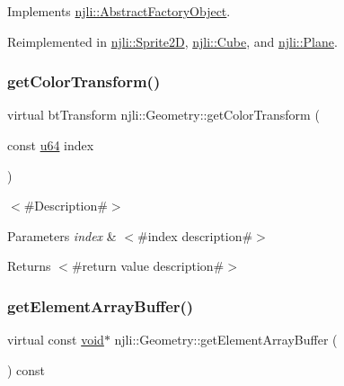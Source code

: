 Implements \mbox{\hyperlink{classnjli_1_1_abstract_factory_object_af4151e41b80d5bc3fc42822c67fc2278}{njli\+::\+Abstract\+Factory\+Object}}.



Reimplemented in \mbox{\hyperlink{classnjli_1_1_sprite2_d_a6e82261effc23589cca219ddb5c90851}{njli\+::\+Sprite2D}}, \mbox{\hyperlink{classnjli_1_1_cube_ab6515dcb9f54a3bf9945dacbb88d2eca}{njli\+::\+Cube}}, and \mbox{\hyperlink{classnjli_1_1_plane_a9a7ccbc86c1f486cd816f0f4f3e9c550}{njli\+::\+Plane}}.

\mbox{\label{classnjli_1_1_geometry_ae7af4b2e9fb67dbc658492290aeeacad}} 
\subsubsection{\texorpdfstring{get\+Color\+Transform()}{getColorTransform()}}
{\footnotesize\ttfamily virtual bt\+Transform njli\+::\+Geometry\+::get\+Color\+Transform (\begin{DoxyParamCaption}\item[{const \mbox{\hyperlink{_util_8h_ad758b7a5c3f18ed79d2fcd23d9f16357}{u64}}}]{index }\end{DoxyParamCaption})\hspace{0.3cm}{\ttfamily [virtual]}}

$<$\#\+Description\#$>$


\begin{DoxyParams}{Parameters}
{\em index} & $<$\#index description\#$>$\\
\hline
\end{DoxyParams}
\begin{DoxyReturn}{Returns}
$<$\#return value description\#$>$ 
\end{DoxyReturn}
\mbox{\label{classnjli_1_1_geometry_ac4edd389ae104da289e2282d780454f0}} 
\subsubsection{\texorpdfstring{get\+Element\+Array\+Buffer()}{getElementArrayBuffer()}}
{\footnotesize\ttfamily virtual const \mbox{\hyperlink{_thread_8h_af1e856da2e658414cb2456cb6f7ebc66}{void}}$\ast$ njli\+::\+Geometry\+::get\+Element\+Array\+Buffer (\begin{DoxyParamCaption}{ }\end{DoxyParamCaption}) const\hspace{0.3cm}{\ttfamily [pure virtual]}}

